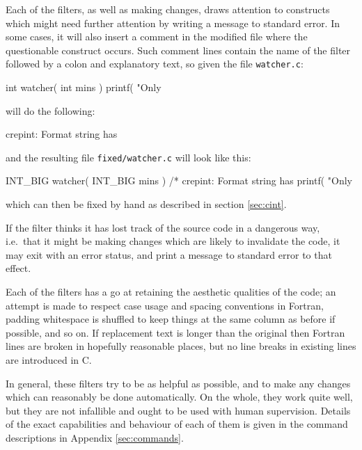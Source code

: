 \documentclass[twoside,11pt,nolof]{starlink}
\providecommand{\xroutine}[1]{\htmlref{\texttt{#1}}{#1}}
\providecommand{\file}[1]{\texttt{#1}}
\newenvironment{squote}{\begin{small}}{\end{small}}
\begin{document}
Each of the filters, as well as making changes,
draws attention to constructs which might need
further attention by writing a message to standard error.
In some cases, it will also insert a comment in the modified file where
the questionable construct occurs.
Such comment lines contain the name of the filter followed by a colon
and explanatory text, so given the file \file{watcher.c}:
\begin{squote}
\begin{terminalv}
   int watcher( int mins ) {
      printf( "Only %
   }
\end{terminalv}
\end{squote}
\xroutine{crepint} will do the following:
\begin{squote}
\begin{terminalv}
crepint: Format string has %
\end{terminalv}
\end{squote}
and the resulting file \file{fixed/watcher.c} will look like this:
\begin{squote}
\begin{terminalv}
INT_BIG watcher( INT_BIG mins ) {
/* crepint: Format string has %
   printf( "Only %
}
\end{terminalv}
\end{squote}
which can then be fixed by hand as described in
section \ref{sec:cint}.

If the filter thinks it has lost track of the source code in a dangerous
way, i.e.\ that it might be making changes which are likely to invalidate
the code, it may exit with an error status, and print a message to standard
error to that effect.

Each of the filters has a go at retaining the aesthetic
qualities of the code; an attempt is made to respect
case usage and spacing conventions in Fortran,
padding whitespace is shuffled to keep things at the same column as
before if possible, and so on.
If replacement text is longer than the original
then Fortran lines are broken in hopefully reasonable places,
but no line breaks in existing lines are introduced in C.

In general, these filters try to be as helpful as possible,
and to make any changes which can reasonably be done automatically.
On the whole, they work quite well, but they are not infallible
and ought to be used with human supervision.
Details of the exact capabilities and behaviour of each of them is
given in the command descriptions in Appendix \ref{sec:commands}.
\end{document}
